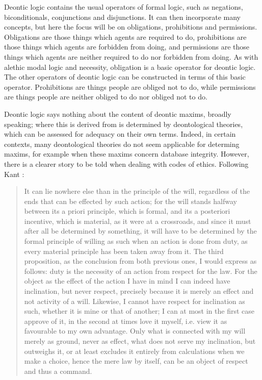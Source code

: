 \documentclass{l4proj}
\begin{document}
Deontic logic contains the usual operators of formal logic, such as negations, biconditionals, conjunctions and disjunctions. It can then incorporate many concepts, but here the focus will be on obligations, prohibitions and permissions. Obligations are those things which agents are required to do, prohibitions are those things which agents are forbidden from doing, and permissions are those things which agents are neither required to do nor forbidden from doing. As with alethic modal logic and necessity, obligation is a basic operator for deontic logic. The other operators of deontic logic can be constructed in terms of this basic operator. Prohibitions are things people are obliged not to do, while permissions are things people are neither obliged to do nor obliged not to do. 

Deontic logic says nothing about the content of deontic maxims, broadly speaking; where this is derived from is determined by deontological theories, which can be assessed for adequacy on their own terms. Indeed, in certain contexts, many deontological theories do not seem applicable for determing maxims, for example when these maxims concern database integrity. However, there is a clearer story to be told when dealing with codes of ethics. Following Kant \cite{groundwork}: 

\blockquote{It can lie nowhere else than in the principle of the will, regardless of the ends that can be effected by such action; for the will stands halfway between its a priori principle, which is formal, and its a posteriori incentive, which is material, as it were at a crossroads, and since it must after all be determined by something, it will have to be determined by the formal principle of willing as such when an action is done from duty, as every material principle has been taken away from it. The third proposition, as the conclusion from both previous ones, I would express as follows: duty is the necessity of an action from respect for the law. For the object as the effect of the action I have in mind I can indeed have inclination, but never respect, precisely because it is merely an effect and not activity of a will. Likewise, I cannot have respect for inclination as such, whether it is mine or that of another; I can at most in the first case approve of it, in the second at times love it myself, i.e. view it as favourable to my own advantage. Only what is connected with my will merely as ground, never as effect, what does not serve my inclination, but outweighs it, or at least excludes it entirely from calculations when we make a choice, hence the mere law by itself, can be an object of respect and thus a command.}
\end{document}
